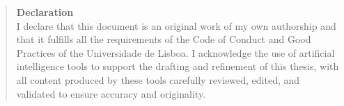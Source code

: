 \begin{quote}
\textbf{Declaration}\\
I declare that this document is an original work of my own authorship
and that it fulfills all the requirements of the Code of Conduct and
Good Practices of the Universidade de Lisboa. I acknowledge the use of
artificial intelligence tools to support the drafting and refinement of
this thesis, with all content produced by these tools carefully
reviewed, edited, and validated to ensure accuracy and originality.
\end{quote}
%